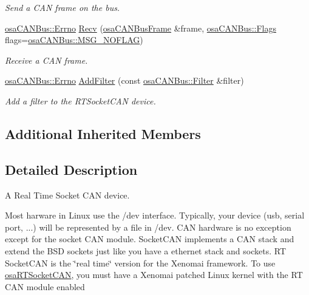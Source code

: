 \begin{DoxyCompactItemize}
\begin{DoxyCompactList}\small\item\em Send a C\+A\+N frame on the bus. \end{DoxyCompactList}\item 
\hyperlink{classosa_c_a_n_bus_a6fa3e95ec4c36932d0640e40e0748fde}{osa\+C\+A\+N\+Bus\+::\+Errno} \hyperlink{classosa_r_t_socket_c_a_n_ad48837c43d6cd6575aa49c1b9959561f}{Recv} (\hyperlink{classosa_c_a_n_bus_frame}{osa\+C\+A\+N\+Bus\+Frame} \&frame, \hyperlink{classosa_c_a_n_bus_a74fe35c6059237887431f3ccece7b21b}{osa\+C\+A\+N\+Bus\+::\+Flags} flags=\hyperlink{classosa_c_a_n_bus_a74fe35c6059237887431f3ccece7b21ba30f701fa6e0dba6e274540941ccd3978}{osa\+C\+A\+N\+Bus\+::\+M\+S\+G\+\_\+\+N\+O\+F\+L\+A\+G})
\begin{DoxyCompactList}\small\item\em Receive a C\+A\+N frame. \end{DoxyCompactList}\item 
\hyperlink{classosa_c_a_n_bus_a6fa3e95ec4c36932d0640e40e0748fde}{osa\+C\+A\+N\+Bus\+::\+Errno} \hyperlink{classosa_r_t_socket_c_a_n_a3a96bca01aa133ada72df390789bf3a4}{Add\+Filter} (const \hyperlink{classosa_c_a_n_bus_1_1_filter}{osa\+C\+A\+N\+Bus\+::\+Filter} \&filter)
\begin{DoxyCompactList}\small\item\em Add a filter to the R\+T\+Socket\+C\+A\+N device. \end{DoxyCompactList}\end{DoxyCompactItemize}
\subsection*{Additional Inherited Members}


\subsection{Detailed Description}
A Real Time Socket C\+A\+N device. 

Most harware in Linux use the /dev interface. Typically, your device (usb, serial port, ...) will be represented by a file in /dev. C\+A\+N hardware is no exception except for the socket C\+A\+N module. Socket\+C\+A\+N implements a C\+A\+N stack and extend the B\+S\+D sockets just like you have a ethernet stack and sockets. R\+T Socket\+C\+A\+N is the \char`\"{}real time\char`\"{} version for the Xenomai framework. To use \hyperlink{classosa_r_t_socket_c_a_n}{osa\+R\+T\+Socket\+C\+A\+N}, you must have a Xenomai patched Linux kernel with the R\+T C\+A\+N module enabled 


